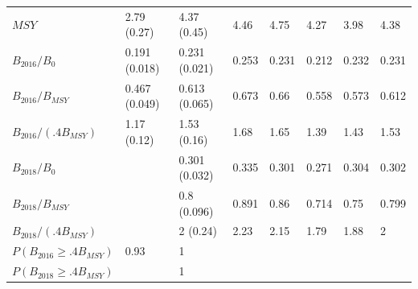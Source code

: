 \documentclass[11pt]{book}
\begin{document}
\begin{landscape}
\begin{longtable}[t]{llllllll}
$MSY$ & 2.79 (0.27) & 4.37 (0.45) & 4.46 & 4.75 & 4.27 & 3.98 & 4.38\\
$B_{2016}/B_0$ & 0.191 (0.018) & 0.231 (0.021) & 0.253 & 0.231 & 0.212 & 0.232 & 0.231\\
$B_{2016}/B_{MSY}$ & 0.467 (0.049) & 0.613 (0.065) & 0.673 & 0.66 & 0.558 & 0.573 & 0.612\\
$B_{2016}/(.4B_{MSY})$ & 1.17 (0.12) & 1.53 (0.16) & 1.68 & 1.65 & 1.39 & 1.43 & 1.53\\
$B_{2018}/B_0$ &  & 0.301 (0.032) & 0.335 & 0.301 & 0.271 & 0.304 & 0.302\\
$B_{2018}/B_{MSY}$ &  & 0.8 (0.096) & 0.891 & 0.86 & 0.714 & 0.75 & 0.799\\
$B_{2018}/(.4B_{MSY})$ &  & 2 (0.24) & 2.23 & 2.15 & 1.79 & 1.88 & 2\\
$P(B_{2016} \geq .4B_{MSY})$ & 0.93 & 1 &  &  &  &  & \\
$P(B_{2018} \geq .4B_{MSY})$ &  & 1 &  &  &  &  & \\*
\end{longtable}
\end{landscape}
\endgroup{}

\newpage
\end{document}
